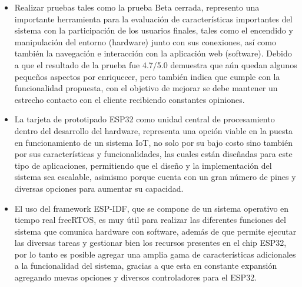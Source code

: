 \begin{itemize}
	\item Realizar pruebas tales como la prueba Beta cerrada, represento una importante herramienta para la evaluación de características importantes del sistema con la participación de los usuarios finales, tales como el encendido y manipulación del entorno (hardware) junto con sus conexiones, así como también la navegación e interacción con la aplicación web (software). Debido a que el resultado de la prueba fue 4.7/5.0 demuestra que aún quedan algunos pequeños aspectos por enriquecer, pero también indica que cumple con la funcionalidad propuesta, con el objetivo de mejorar se debe mantener un estrecho contacto con el cliente recibiendo constantes opiniones.\\
	
	\item La tarjeta de prototipado ESP32 como unidad central de procesamiento dentro del desarrollo del hardware, representa una opción viable en la puesta en funcionamiento de un sistema IoT, no solo por su bajo costo sino también por sus características y funcionalidades, las cuales están diseñadas para este tipo de aplicaciones, permitiendo que el diseño y la implementación del sistema sea escalable, asimismo porque cuenta con un gran número de pines y diversas opciones para aumentar su capacidad.\\
	
	\item El uso del framework ESP-IDF, que se compone de un sistema operativo en tiempo real freeRTOS, es muy útil para realizar las diferentes funciones del sistema que comunica hardware con software, además de que permite ejecutar las diversas tareas y gestionar bien los recursos presentes en el chip ESP32, por lo tanto es posible agregar una amplia gama de características adicionales a la funcionalidad del sistema, gracias a que esta en constante expansión agregando nuevas opciones y diversos controladores para el ESP32.\\
	
\end{itemize}